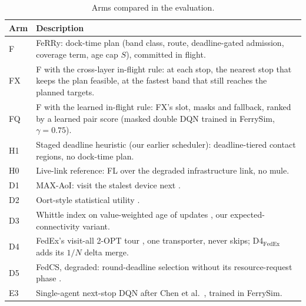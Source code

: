 \documentclass[conference]{IEEEtran}
\begin{document}
\begin{table}[t]
\centering
\caption{Arms compared in the evaluation.}
\label{tab:exp5_arms}
\small
\begin{tabularx}{\columnwidth}{l X}
\toprule
\textbf{Arm} & \textbf{Description} \\
\midrule
F & FeRRy: dock-time plan (band class, route, deadline-gated admission, coverage term, age cap $S$), committed in flight. \\
FX & F with the cross-layer in-flight rule: at each stop, the nearest stop that keeps the plan feasible, at the fastest band that still reaches the planned targets. \\
FQ & F with the learned in-flight rule: FX's slot, masks and fallback, ranked by a learned pair score (masked double DQN trained in FerrySim, $\gamma=0.75$). \\
H1 & Staged deadline heuristic (our earlier scheduler): deadline-tiered contact regions, no dock-time plan. \\
H0 & Live-link reference: FL over the degraded infrastructure link, no mule. \\
D1 & MAX-AoI: visit the stalest device next \cite{kadota2018scheduling}. \\
D2 & Oort-style statistical utility \cite{lai2021oort}. \\
D3 & Whittle index on value-weighted age of updates \cite{cui2023data}, our expected-connectivity variant. \\
D4 & FedEx's visit-all 2-OPT tour \cite{bian2025indirect}, one transporter, never skips; D4$_{\text{FedEx}}$ adds its $1/N$ delta merge. \\
D5 & FedCS, degraded: round-deadline selection without its resource-request phase \cite{nishio2019client}. \\
E3 & Single-agent next-stop DQN after Chen et al.\ \cite{chen2023model}, trained in FerrySim. \\
\bottomrule
\end{tabularx}
\end{table}
\end{document}
